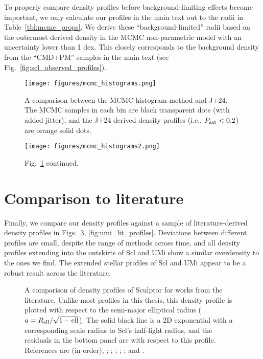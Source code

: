 To properly compare density profiles before background-limiting effects
become important, we only calculate our profiles in the main text out to
the radii in Table~\ref{tbl:mcmc_props}. We derive these
``background-limited'' radii based on the outermost derived density in
the MCMC non-parametric model with an uncertainty lower than 1 dex. This
closely corresponds to the background density from the ``CMD+PM''
samples in the main text (see Fig.~\ref{fig:scl_observed_profiles}).

\begin{figure}
\centering
\texttt{[image: figures/mcmc\_histograms.png]}
\caption[Probabilistic density profiles]{A comparison between the MCMC
histogram method and J+24. The MCMC samples in each bin are black
transparent dots (with added jitter), and the J+24 derived density
profiles (i.e., \(P_{\rm sat} < 0.2\)) are orange solid
dots.}\label{fig:mcmc_hists}
\end{figure}

\begin{figure}
\centering
\texttt{[image: figures/mcmc\_histograms2.png]}
\caption[Probabilistic density profiles
continued]{Fig.~\ref{fig:mcmc_hists} continued.}\label{fig:mcmc_hists2}
\end{figure}

\section{Comparison to literature}\label{comparison-to-literature}

Finally, we compare our density profiles against a sample of
literature-derived density profiles in
Figs.~\ref{fig:scl_lit_profiles}, \ref{fig:umi_lit_profiles}. Deviations
between different profiles are small, despite the range of methods
across time, and all density profiles extending into the outskirts of
Scl and UMi show a similar overdensity to the ones we find. The extended
stellar profiles of Scl and UMi appear to be a robust result across the
literature.

\begin{figure}
\centering
{}
\caption[Sculptor literature density profiles]{A comparison of density
profiles of Sculptor for works from the literature. Unlike most profiles
in this thesis, this density profile is plotted with respect to the
semi-major elliptical radius (\(a = R_{\rm ell} / \sqrt{1-{\rm ell}}\)).
The solid black line is a 2D exponential with a corresponding scale
radius to Scl's half-light radius, and the residuals in the bottom panel
are with respect to this profile. References are (in order),
\citet{munoz+2018}; \citet{westfall+2006}; \citet{walcher+2003};
\citet{eskridge1988}; \citet{demers+krautter+kunkel1980}; and
\citet{hodge1961}.}\label{fig:scl_lit_profiles}
\end{figure}

